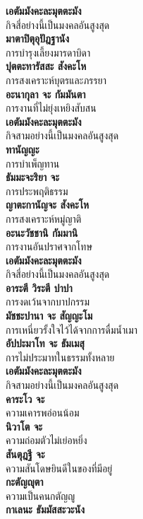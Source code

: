 \documentclass[12pt]{article}
\begin{document}
\textbf{เอตัมมังคะละมุตตะมัง}\\
\indent กิจสี่อย่างนี้เป็นมงคลอันสูงสุด\\
\textbf{มาตาปิตุอุปัฎฐานัง}\\
\indent การบำรุงเลี้ยงมารดาบิดา\\
\textbf{ปุตตะทารัสสะ สังคะโห}\\
\indent การสงเคราะห์บุตรและภรรยา\\
\textbf{อะนากุลา จะ กัมมันตา}\\
\indent การงานที่ไม่ยุ่งเหยิงสับสน\\
\textbf{เอตัมมังคะละมุตตะมัง}\\
\indent กิจสามอย่างนี้เป็นมงคลอันสูงสุด\\
\textbf{ทานัญญะ}\\
\indent การบำเพ็ญทาน\\
\textbf{ธัมมะจะริยา จะ}\\
\indent การประพฤติธรรม\\
\textbf{ญาตะกานัญจะ สังคะโห}\\
\indent การสงเคราะห์หมู่ญาติ\\
\textbf{อะนะวัชชานิ กัมมานิ}\\
\indent การงานอันปราศจากโทษ\\
\textbf{เอตัมมังคะละมุตตะมัง}\\
\indent กิจสี่อย่างนี้เป็นมงคลอันสูงสุด\\
\textbf{อาระตี วิระตี ปาปา}\\
\indent การงดเว้นจากบาปกรรม\\
\textbf{มัชชะปานา จะ สัญญะโม}\\
\indent การเหนี่ยวรั้งใจไว้ได้จากการดื่มน้ำเมา\\
\textbf{อัปปะมาโท จะ ธัมเมสุ}\\
\indent การไม่ประมาทในธรรมทั้งหลาย\\
\textbf{เอตัมมังคะละมุตตะมัง}\\
\indent กิจสามอย่างนี้เป็นมงคลอันสูงสุด\\
\textbf{คาระโว จะ}\\
\indent ความเคารพอ่อนน้อม\\
\textbf{นิวาโต จะ}\\
\indent ความถ่อมตัวไม่เย่อหยิ่ง\\
\textbf{สันตุฎฐี จะ}\\
\indent ความสันโดษยินดีในของที่มีอยู่\\
\textbf{กะตัญญุตา}\\
\indent ความเป็นคนกตัญญู\\
\textbf{กาเลนะ ธัมมัสสะวะนัง}\\
\end{document}
